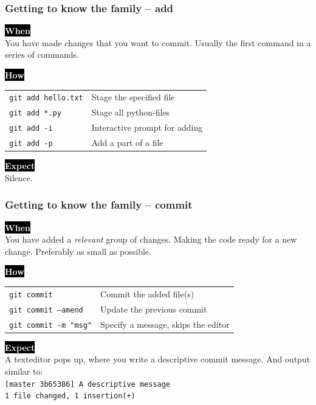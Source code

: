 \documentclass{beamer}
\newcommand{\keyword}[1]{\hspace{-1.0em}\colorbox{black}{\textcolor{white}{\textbf{#1}\vphantom{Ep}}}\vspace{0.2em}} %
\begin{document}
\begin{frame}
  \frametitle{Getting to know the family -- add}
  \keyword{When}\\
    You have made changes that you want to commit.
    Usually the first command in a series of commands.
  \vspace{0.5em}

  \keyword{How}\\
  \hspace{-1.0em}
  \begin{tabular}{ll}
    \texttt{git add hello.txt} & Stage the specified file \\
    \texttt{git add *.py} & Stage all python-files \\
    \texttt{git add -i} & Interactive prompt for adding \\
    \texttt{git add -p} & Add a part of a file \\
  \end{tabular}
  \vspace{0.5em}

  \keyword{Expect}\\
  Silence.
\end{frame}

\begin{frame}
  \frametitle{Getting to know the family -- commit}
  \keyword{When}\\
    You have added a \emph{relevant} group of changes. Making
    the code ready for a new change. Preferably as small as possible.
  \vspace{0.5em}

  \keyword{How}\\
  \hspace{-1.0em}
  \begin{tabular}{ll}
    \texttt{git commit} & Commit the added file(s) \\
    \texttt{git commit --amend} & Update the previous commit \\
    \texttt{git commit -m "msg"} & Specify a message, skips the editor \\
  \end{tabular}
  \vspace{0.5em}

  \keyword{Expect}\\
  A texteditor pops up, where you write a descriptive commit message. And
  output similar to: \\
  \texttt{[master 3b65386] A descriptive message} \\
  \texttt{1 file changed, 1 insertion(+)}

\end{frame}
\end{document}

